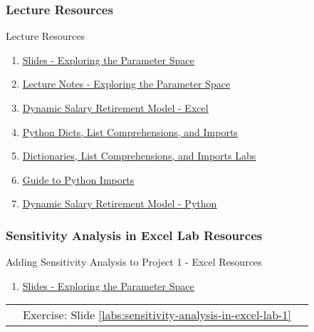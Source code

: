 \documentclass[handout, 11pt]{beamer}
\begin{document}
\begin{frame}
\frametitle{Lecture Resources}
{
\begin{block}{Lecture Resources}
\begin{enumerate}
\item \textcolor{blue}{\underline{\href{https://nickderobertis.github.io/fin-model-course/\_static/generated/pdfs/S7 Exploring the Parameter Space.pdf}{Slides - Exploring the Parameter Space}}}
\item \textcolor{blue}{\underline{\href{https://nickderobertis.github.io/fin-model-course/\_static/generated/pdfs/LN7 Exploring the Parameter Space.pdf}{Lecture Notes - Exploring the Parameter Space}}}
\item \textcolor{blue}{\underline{\href{https://nickderobertis.github.io/fin-model-course/\_static/Examples/Introduction/Excel/Dynamic Salary Retirement Model.xlsx}{Dynamic Salary Retirement Model - Excel}}}
\item \textcolor{blue}{\underline{\href{https://nickderobertis.github.io/fin-model-course/\_static/Examples/Introduction/Python/Python Dicts, List comprehensions, and Imports.ipynb}{Python Dicts, List Comprehensions, and Imports}}}
\item \textcolor{blue}{\underline{\href{https://nickderobertis.github.io/fin-model-course/\_static/Materials for Lab Exercises/Python Basics/Dicts and List Comprehensions Lab.ipynb}{Dictionaries, List Comprehensions, and Imports Labs}}}
\item \textcolor{blue}{\underline{\href{https://realpython.com/absolute-vs-relative-python-imports/}{Guide to Python Imports}}}
\item \textcolor{blue}{\underline{\href{https://nickderobertis.github.io/fin-model-course/\_static/Examples/Introduction/Python/Dynamic Salary Retirement Model.ipynb}{Dynamic Salary Retirement Model - Python}}}
\end{enumerate}
\vfill
\end{block}
}
\label{frames:resources}
\end{frame}
\begin{frame}
\frametitle{Sensitivity Analysis in Excel Lab Resources}
{
\begin{block}{Adding Sensitivity Analysis to Project 1 - Excel Resources}
\begin{enumerate}
\item \textcolor{blue}{\underline{\href{https://nickderobertis.github.io/fin-model-course/\_static/generated/pdfs/S7 Exploring the Parameter Space.pdf}{Slides - Exploring the Parameter Space}}}
\end{enumerate}
\vfill
\begin{tabular*}{\textwidth}{@{\extracolsep{\fill}}ccc}
\toprule
\hfill & Exercise: Slide \textcolor{blue}{\underline{\ref{labs:sensitivity-analysis-in-excel-lab-1}}} & \hfill\\

\end{tabular*}
\end{block}
}
\label{labs:sensitivity-analysis-in-excel-lab-1-resources}
\end{frame}
\end{document}
